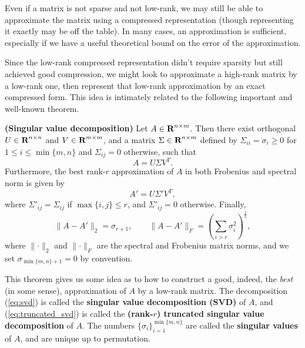 \documentclass{article}
\begin{document}
	Even if a matrix is not sparse and not low-rank, we may still be able to approximate the matrix using a compressed representation (though representing it exactly may be off the table). In many cases, an approximation is sufficient, especially if we have a useful theoretical bound on the error of the approximation.
	
	Since the low-rank compressed representation didn't require sparsity but still achieved good compression, we might look to approximate a high-rank matrix by a low-rank one, then represent that low-rank approximation by an exact compressed form. This idea is intimately related to the following important and well-known theorem.
	
	\begin{thm} \textnormal{\bf(Singular value decomposition)}
		\label{thm:svd}
		Let $A \in \textnormal{\bf R}^{n \times m}$. Then there exist orthogonal $U \in \textnormal{\bf R}^{n\times n}$ and $V \in \textnormal{\bf R}^{m\times m}$, and a matrix $\Sigma \in \textnormal{\bf R}^{n\times m}$ defined by $\Sigma_{ii} = \sigma_i \ge 0$ for $1 \le i \le \min\{m,n\}$ and $\Sigma_{ij} = 0$ otherwise, such that
		\begin{equation}
			\label{eq:svd}
			A = U \Sigma V^T.
		\end{equation}
		Furthermore, the best rank-$r$ approximation of $A$ in both Frobenius and spectral norm is given by
		\begin{equation}
			\label{eq:truncated_svd}
			A' = U\Sigma' V^T,
		\end{equation}
		where $\Sigma'_{ij} = \Sigma_{ij}$ if $\max\{i,j\} \le r$, and $\Sigma'_{ij} = 0$ otherwise. Finally,
		\begin{equation}
			\lVert A - A'\rVert_2 = \sigma_{r+1}, \qquad \lVert A - A'\rVert_F = \left(\sum_{i > r} \sigma_i^2\right)^\frac{1}{2},
		\end{equation}
		where $\lVert \cdot \rVert_2$ and $\lVert \cdot \rVert_F$ are the spectral and Frobenius matrix norms, and we set $\sigma_{\min\{m,n\}+1} = 0$ by convention.
	\end{thm}
	
	This theorem gives us some idea as to how to construct a good, indeed, the \textit{best} (in some sense), approximation of $A$ by a low-rank matrix. The decomposition (\ref{eq:svd}) is called the \textbf{singular value decomposition (SVD)} of $A$, and (\ref{eq:truncated_svd}) is called the \textbf{(rank-$r$) truncated singular value decomposition} of $A$. The numbers $\{\sigma_i\}_{i=1}^{\min\{m,n\}}$ are called the \textbf{singular values} of $A$, and are unique up to permutation.
	
\end{document}
